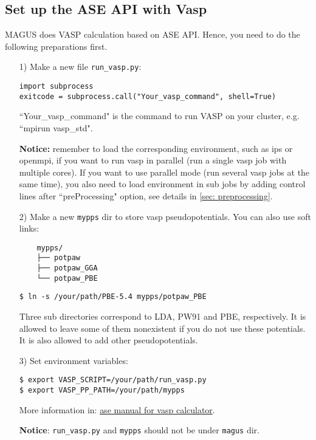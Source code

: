 \documentclass[12pt,oneside]{book}
\newcommand{\file}[1]{\texttt{#1}}
\begin{document}
\subsection{Set up the ASE API with Vasp}
MAGUS does VASP calculation based on ASE API. Hence, you need to do the following preparations first.
\begin{itemize}
\item [1)] 
    Make a new file \file{run\_vasp.py}:
    \begin{tcolorbox}
    \begin{verbatim}
import subprocess
exitcode = subprocess.call("Your_vasp_command", shell=True)
    \end{verbatim}
    \end{tcolorbox}
    ``Your\_vasp\_command" is the command to run VASP on your cluster, e.g. ``mpirun vasp\_std".

    \textbf{Notice:} remember to load the corresponding environment, such as ips or openmpi, if you want to run vasp in parallel (run a single vasp job with multiple cores). If you want to use parallel mode (run several vasp jobs at the same time), you also need to load environment in sub jobs by adding control lines after ``preProcessing" option, see details in \ref{sec: preprocessing}.
    
\item [2)] 
    Make a new \file{mypps} dir to store vasp pseudopotentials. You can also use soft links:
    \begin{verbatim}
    mypps/
    ├── potpaw
    ├── potpaw_GGA
    └── potpaw_PBE
    \end{verbatim}
    \begin{tcolorbox}
        \begin{verbatim}
$ ln -s /your/path/PBE-5.4 mypps/potpaw_PBE
        \end{verbatim}
    \end{tcolorbox}
    Three sub directories correspond to LDA, PW91 and PBE, respectively. It is allowed to leave some of them nonexistent if you do not use these potentials. It is also allowed to add other pseudopotentials.
\item [3)] 
    Set environment variables:
    \begin{tcolorbox}
        \begin{verbatim}
$ export VASP_SCRIPT=/your/path/run_vasp.py
$ export VASP_PP_PATH=/your/path/mypps
        \end{verbatim}
    \end{tcolorbox}
    More information in: \textcolor{blue}{\href{https://wiki.fysik.dtu.dk/ase/ase/calculators/vasp.html\#module-ase.calculators.vasp}{ase manual for vasp calculator}}.\par
    \textbf{Notice}: \file{run\_vasp.py} and \file{mypps} should not be under \file{magus} dir.
\end{itemize}
\end{document}
